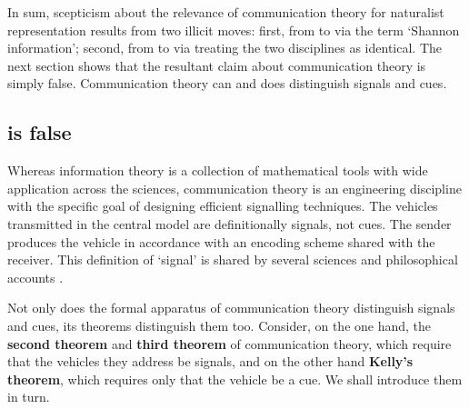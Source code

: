 

In sum, scepticism about the relevance of communication theory for naturalist representation results from two illicit moves: first, from \ami{} to \ait{} via the term `Shannon information'; second, from \ait{} to \act{} via treating the two disciplines as identical.
The next section shows that the resultant claim about communication theory is simply false.
Communication theory can and does distinguish signals and cues.


\subsection{\act{} is false}

Whereas information theory is a collection of mathematical tools with wide application across the sciences, communication theory is an engineering discipline with the specific goal of designing efficient signalling techniques.
The vehicles transmitted in the central model are definitionally signals, not cues.
The sender produces the vehicle in accordance with an encoding scheme shared with the receiver.
This definition of `signal' is shared by several sciences \citep{shannon1948mathematicala,maynardsmith2003animal} and philosophical accounts \citep[$\S$6]{millikan2004varieties} \citep{bergstrom2011transmission}.

Not only does the formal apparatus of communication theory distinguish signals and cues, its theorems distinguish them too.
Consider, on the one hand, the \textbf{second theorem} and \textbf{third theorem} of communication theory, which require that the vehicles they address be signals, and on the other hand \textbf{Kelly's theorem}, which requires only that the vehicle be a cue.
We shall introduce them in turn.

